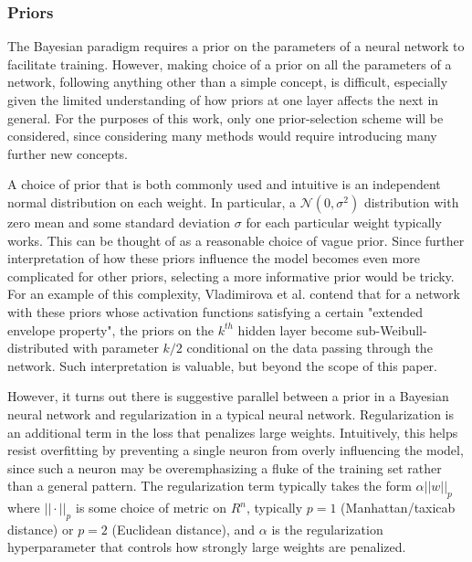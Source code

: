 \documentclass[12pt]{article}
\begin{document}
\subsubsection{Priors}

The Bayesian paradigm requires a prior on the parameters of a neural network to facilitate training. However, making choice of a prior on all the parameters of a network, following anything other than a simple concept, is difficult, especially given the limited understanding of how priors at one layer affects the next in general. For the purposes of this work, only one prior-selection scheme will be considered, since considering many methods would require introducing many further new concepts. 

A choice of prior that is both commonly used and intuitive is an independent normal distribution on each weight. In particular, a $\mathcal{N}(0, \sigma^2)$ distribution with zero mean and some standard deviation $\sigma$ for each particular weight typically works. This can be thought of as a reasonable choice of vague prior. Since further interpretation of how these priors influence the model becomes even more complicated for other priors, selecting a more informative prior would be tricky. For an example of this complexity, Vladimirova et al. contend that for a network with these priors whose activation functions satisfying a certain "extended envelope property", the priors on the $k^{th}$ hidden layer become sub-Weibull-distributed with parameter $k/2$ conditional on the data passing through the network. Such interpretation is valuable, but beyond the scope of this paper.

However, it turns out there is suggestive parallel between a prior in a Bayesian neural network and regularization in a typical neural network. Regularization is an additional term in the loss that penalizes large weights. Intuitively, this helps resist overfitting by preventing a single neuron from overly influencing the model, since such a neuron may be overemphasizing a fluke of the training set rather than a general pattern. The regularization term typically takes the form $\alpha ||w||_p$  where $||\cdot||_p$ is some choice of metric on $R^n$, typically $p=1$ (Manhattan/taxicab distance) or $p=2$ (Euclidean distance), and $\alpha$ is the regularization hyperparameter that controls how strongly large weights are penalized. 
\end{document}
